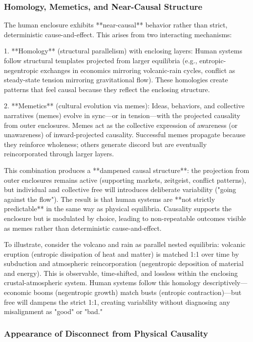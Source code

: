 \subsubsection{Homology, Memetics, and Near-Causal Structure}

The human enclosure exhibits **near-causal** behavior rather than strict, deterministic cause-and-effect. This arises from two interacting mechanisms:

1. **Homology** (structural parallelism) with enclosing layers: Human systems follow structural templates projected from larger equilibria (e.g., entropic-negentropic exchanges in economics mirroring volcanic-rain cycles, conflict as steady-state tension mirroring gravitational flow). These homologies create patterns that feel causal because they reflect the enclosing structure.

2. **Memetics** (cultural evolution via memes): Ideas, behaviors, and collective narratives (memes) evolve in sync—or in tension—with the projected causality from outer enclosures. Memes act as the collective expression of awareness (or unawareness) of inward-projected causality. Successful memes propagate because they reinforce wholeness; others generate discord but are eventually reincorporated through larger layers.

This combination produces a **dampened causal structure**: the projection from outer enclosures remains active (supporting markets, zeitgeist, conflict patterns), but individual and collective free will introduces deliberate variability ("going against the flow"). The result is that human systems are **not strictly predictable** in the same way as physical equilibria. Causality supports the enclosure but is modulated by choice, leading to non-repeatable outcomes visible as memes rather than deterministic cause-and-effect.

To illustrate, consider the volcano and rain as parallel nested equilibria: volcanic eruption (entropic dissipation of heat and matter) is matched 1:1 over time by subduction and atmospheric reincorporation (negentropic deposition of material and energy). This is observable, time-shifted, and lossless within the enclosing crustal-atmospheric system. Human systems follow this homology descriptively—economic booms (negentropic growth) match busts (entropic contraction)—but free will dampens the strict 1:1, creating variability without diagnosing any misalignment as "good" or "bad."

\subsubsection{Appearance of Disconnect from Physical Causality}

